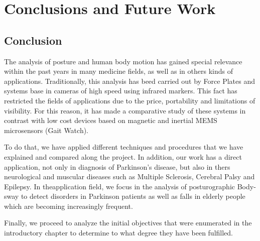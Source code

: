 \chapter{Conclusions and Future Work}
\label{ch:Conlcusion}
\section{Conclusion}
The analysis of posture and human body motion  has gained special relevance within the past years in many medicine fields, as well as in others kinds of applications. Traditionally, this analysis has beed carried out by Force Plates and systems base in cameras of high speed using infrared markers. This fact has restricted the fields of applications due to the price, portability and limitations of visibility. For this reason, it has made a comparative study of these systems in contrast with low cost devices based on magnetic and inertial MEMS microsensors (Gait Watch).

To do that, we have applied different techniques and procedures that we have explained and compared along the project.
In addition, our work has a direct application, not only in diagnosis of Parkinson’s disease, but also in thers neurological and muscular diseases such as Multiple Sclerosis, Cerebral Palsy and Epilepsy. In theapplication field, we focus in the analysis of posturographic  Body-sway to detect disorders in Parkinson patients as well as falls in elderly people which are becoming increasingly frequent.

Finally, we proceed to analyze the initial objectives that were enumerated in the introductory chapter to determine to what degree they have been fulfilled.

